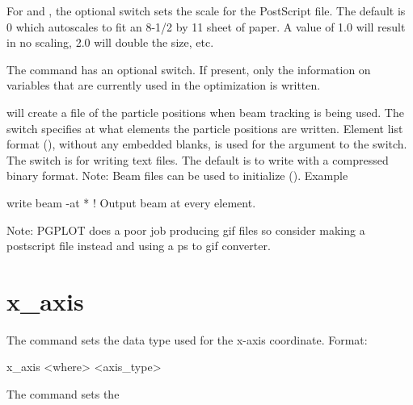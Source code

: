 {{{{For  and , the optional  switch sets the
scale for the PostScript file. The default is 0 which autoscales to fit an
8-1/2 by 11 sheet of paper. A value of 1.0 will result in no scaling,
2.0 will double the size, etc.

The  command has an optional 
switch.  If present, only the information on variables that are
currently used in the optimization is written.

 will create a file of the particle positions when
beam tracking is being used. The  switch specifies at what
elements the particle positions are written. Element list format
(), without any embedded blanks, is used for
the  argument to the  switch. The
 switch is for writing text files. The default is to write
with a compressed binary format.  Note: Beam files can be used to
initialize \tao (). Example
\begin{example}
  write beam -at *   ! Output beam at every element.
\end{example}

Note: PGPLOT does a poor job producing gif files so consider
making a postscript file instead and using a ps to gif converter.

\section{x_axis}
\label{s:x.axis}

The  command sets the data type used for the x-axis coordinate.
Format:
\begin{example}
  x_axis <where> <axis_type>
\end{example}

\vskip 0.1in 

The  command sets the \vn{plot%
what data is used for the horizontal axis. Possibilities
for \vn{<axis_type>} are:
\begin{example}
  index     -- Use data index
  ele_index -- Use data element index
  s         -- Use longitudinal position.
\end{example}
Note that \vn{index} only makes sense for data that has an index
associated with it.

Examples:
\begin{example}
  x_axis * s
  x_axis top index
\end{example}

}}}}}
